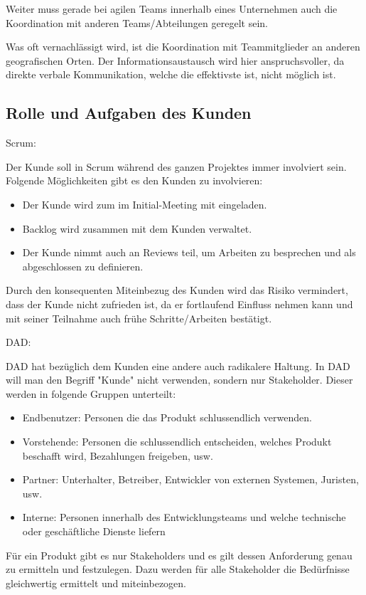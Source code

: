 Weiter muss gerade bei agilen Teams innerhalb eines Unternehmen auch die Koordination mit anderen Teams/Abteilungen geregelt sein.
\medskip

Was oft vernachlässigt wird, ist die Koordination mit Teammitglieder an anderen geografischen Orten. Der Informationsaustausch wird hier anspruchsvoller, da direkte verbale Kommunikation, welche die effektivste ist, nicht möglich ist.


\subsection{Rolle und Aufgaben des Kunden}

{\Large Scrum:} \cite{planningPrioScrum} \medskip

Der Kunde soll in Scrum während des ganzen Projektes immer involviert sein. Folgende Möglichkeiten gibt es den Kunden zu involvieren:
\begin{itemize}
	\item Der Kunde wird zum im Initial-Meeting mit eingeladen.
	\item Backlog wird zusammen mit dem Kunden verwaltet.
	\item Der Kunde nimmt auch an Reviews teil, um Arbeiten zu besprechen und als abgeschlossen zu definieren.
\end{itemize}
Durch den konsequenten Miteinbezug des Kunden wird das Risiko vermindert, dass der Kunde nicht zufrieden ist, da er fortlaufend Einfluss nehmen kann und mit seiner Teilnahme auch frühe Schritte/Arbeiten bestätigt.
\bigskip 

{\Large DAD:} \cite{planningPrioDad} \medskip

DAD hat bezüglich dem Kunden eine andere auch radikalere Haltung. In DAD will man den Begriff "Kunde" nicht verwenden, sondern nur Stakeholder. Dieser werden in folgende Gruppen unterteilt:
\begin{itemize}
	\item Endbenutzer: Personen die das Produkt schlussendlich verwenden.
	\item Vorstehende: Personen die schlussendlich entscheiden, welches Produkt beschafft wird, Bezahlungen freigeben, usw.
	\item Partner: Unterhalter, Betreiber, Entwickler von externen Systemen, Juristen, usw.
	\item Interne: Personen innerhalb des Entwicklungsteams und welche technische oder geschäftliche Dienste liefern
\end{itemize}
Für ein Produkt gibt es nur Stakeholders und es gilt dessen Anforderung genau zu ermitteln und festzulegen. Dazu werden für alle Stakeholder die Bedürfnisse gleichwertig ermittelt und miteinbezogen. \smallskip

